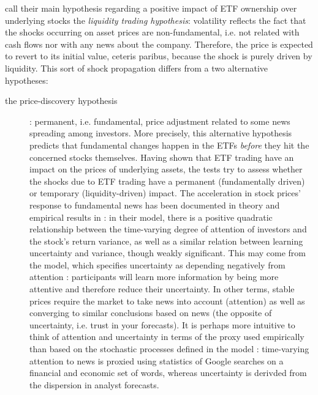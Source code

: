 \textcite{Ben-David2018} call their main hypothesis regarding a positive impact of ETF ownership over underlying stocks the \emph{liquidity trading hypothesis}: volatility reflects the fact that the shocks occurring on asset prices are non-fundamental, i.e. not related with cash flows nor with any news about the company. Therefore, the price is expected to revert to its initial value, ceteris paribus, because the shock is purely driven by liquidity. This sort of shock propagation differs from a two alternative hypotheses:
\begin{description}
\item[the price-discovery hypothesis]: permanent, i.e. fundamental, price adjustment related to some news spreading among investors. More precisely, this alternative hypothesis predicts that fundamental changes happen in the ETFs \emph{before} they hit the concerned stocks themselves. Having shown that ETF trading have an impact on the prices of underlying assets, the tests try to assess whether the shocks due to ETF trading have a permanent (fundamentally driven) or temporary (liquidity-driven) impact. The acceleration in stock prices' response to fundamental news has been documented in theory and empirical results in \textcite{Andrei2015} : in their model, there is a positive quadratic relationship between the time-varying degree of attention of investors and the stock's return variance, as well as a similar relation between learning uncertainty and variance, though weakly significant. This may come from the model, which specifies uncertainty as depending negatively from attention :  participants will learn more information by being more attentive and therefore reduce their uncertainty. In other terms, stable prices require the market to take news into account (attention) as well as converging to similar conclusions based on news (the opposite of uncertainty, i.e. trust in your forecasts). It is perhaps more intuitive to think of attention and uncertainty in terms of the proxy used empirically than based on the stochastic processes defined in the model : time-varying attention to news is proxied using statistics of Google searches on a financial and economic set of words, whereas uncertainty is derivded from the dispersion in analyst forecasts.

\end{description}
